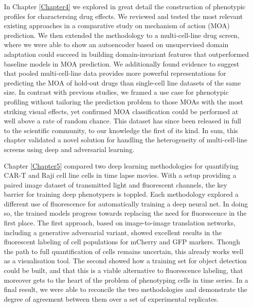 In Chapter \ref{Chapter4} we explored in great detail the construction of phenotypic profiles for charactersing drug effects. We reviewed and tested the most relevant existing approaches in a comparative study on mechanism of action (MOA) prediction. We then extended the methodology to a multi-cell-line drug screen, where we were able to show an autoencoder based on unsupervised domain adaptation could succeed in building domain-invariant features that outperformed baseline models in MOA prediction. We additionally found evidence to suggest that pooled multi-cell-line data provides more powerful representations for predicting the MOA of hold-out drugs than single-cell line datasets of the same size. In contrast with previous studies, we framed a use case for phenotypic profiling without tailoring the prediction problem to those MOAs with the most striking visual effects, yet confirmed MOA classification could be performed at well above a rate of random chance. This dataset has since been released in full to the scientific community, to our knowledge the first of its kind. In sum, this chapter validated a novel solution for handling the heterogeneity of multi-cell-line screens using deep and adversarial learning.

Chapter \ref{Chapter5} compared two deep learning methodologies for quantifying CAR-T and Raji cell line cells in time lapse movies. With a setup providing a paired image dataset of transmitted light and fluorescent channels, the key barrier for training deep phenotypers is toppled. Each methodology explored a different use of fluorescence for automatically training a deep neural net. In doing so, the trained models progress towards replacing the need for fluorescence in the first place. The first approach, based on image-to-image translation networks, including a generative adversarial variant, showed excellent results in the fluorescent labeling of cell populations for mCherry and GFP markers. Though the path to full quantification of cells remains uncertain, this already works well as a visualisation tool. The second showed how a training set for object detection could be built, and that this is a viable alternative to fluorescence labeling, that moreover gets to the heart of the problem of phenotyping cells in time series. In a final result, we were able to reconcile the two methodologies and demonstrate the degree of agreement between them over a set of experimental replicates.

